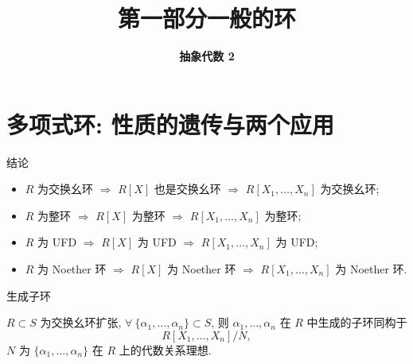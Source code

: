 \everymath{\displaystyle}



\title[第一部分\\
一般的环]{\texorpdfstring{\LARGE \bfseries 第一部分\quad 一般的环}{第一部分 一般的环}}
\author[抽象代数 2]{\Large \bfseries 抽象代数 2}
\date{}





\begin{frame}

\titlepage %

\end{frame}


\section[多项式环]{多项式环: 性质的遗传与两个应用}


\begin{frame}{结论}

\begin{itemize}
\item[(i)] $R$ 为交换幺环 $\Longrightarrow$ $R[X]$ 也是交换幺环
  $\Longrightarrow$ $R[X_1, \dots, X_n]$ 为交换幺环;
\item[(ii)] $R$ 为整环 $\Longrightarrow$ $R[X]$ 为整环
  $\Longrightarrow$ $R[X_1, \dots, X_n]$ 为整环;
\item[(iii)] $R$ 为 UFD $\Longrightarrow$ $R[X]$ 为 UFD
  $\Longrightarrow$ $R[X_1, \dots, X_n]$ 为 UFD;
\item[(iv)] $R$ 为 Noether 环 $\Longrightarrow$ $R[X]$ 为 Noether 环
  $\Longrightarrow$ $R[X_1, \dots, X_n]$ 为 Noether 环.
\end{itemize}

\end{frame}


\begin{frame}{生成子环}

\begin{prop}[生成子环]
$R \subset S$ 为交换幺环扩张,
$\forall\ \{\alpha_1, \dots, \alpha_n\} \subset S$, 则 $\alpha_1, \dots, \alpha_n$
在 $R$ 中生成的子环同构于
\[
R[X_1, \dots, X_n] \big/ N,
\]
$N$ 为 $\{\alpha_1, \dots, \alpha_n\}$ 在 $R$ 上的代数关系理想.
\end{prop}

\end{frame}

